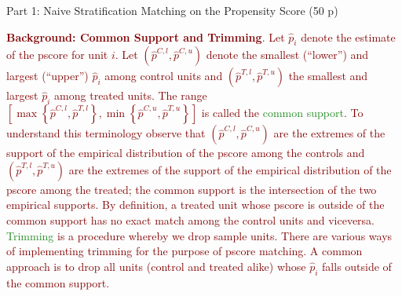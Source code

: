 \documentclass{article}
\begin{document}
\newpage

\begin{center}
{\LARGE Part 1: Naive Stratification Matching on the Propensity Score (50 p)}
\end{center}

\noindent \textcolor{Maroon}{\textbf{Background: Common Support and Trimming}. Let $\widehat{p}_i$ denote the estimate of the pscore for unit $i$. Let $\left(\widehat{p}^{C,l},\widehat{p}^{C,u}\right)$ denote the smallest (``lower'') and largest (``upper'') $\widehat{p}_{i}$ among control units and $\left(\widehat{p}^{T,l},\widehat{p}^{T,u}\right) $ the smallest and largest $\widehat{p}_{i}$ among treated units. The range $\left[\max \left\{ \widehat{p}^{C,l},\widehat{p}^{T,l}\right\},\min \left\{ \widehat{p}^{C,u},\widehat{p}^{T,u}\right\} \right] $ is called the \textcolor{ForestGreen}{common support}. To understand this terminology observe that $\left(\widehat{p}^{C,l},\widehat{p}^{C,u}\right)$ are the extremes of the support of the empirical distribution of the pscore among the controls and $\left(\widehat{p}^{T,l},\widehat{p}^{T,u}\right) $ are the extremes of the support of the empirical distribution of the pscore among the treated; the common support is the intersection of the two empirical supports. By definition, a treated unit whose pscore is outside of the common support has no exact match among the control units and viceversa. \textcolor{ForestGreen}{Trimming} is a procedure whereby we drop sample units. There are various ways of implementing trimming for the purpose of pscore matching. A common approach is to drop all units (control and treated alike) whose $\widehat{p}_{i}$ falls outside of the common support.}
\end{document}
